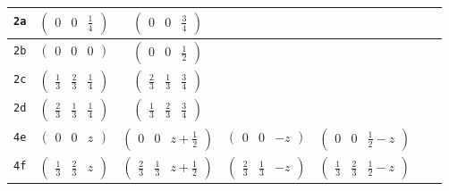 \documentclass[fleqn,9pt,landscape]{jsarticle}
\begin{document}
\begin{center}
\begin{longtable}{ccccccc}
{\tt 2a} & $ \begin{pmatrix} 0 & 0 & \frac{1}{4} \end{pmatrix} $ & $ \begin{pmatrix} 0 & 0 & \frac{3}{4} \end{pmatrix} $ & $  $ & $  $ & $  $ & $  $ \\ \hline
{\tt 2b} & $ \begin{pmatrix} 0 & 0 & 0 \end{pmatrix} $ & $ \begin{pmatrix} 0 & 0 & \frac{1}{2} \end{pmatrix} $ & $  $ & $  $ & $  $ & $  $ \\ \hline
{\tt 2c} & $ \begin{pmatrix} \frac{1}{3} & \frac{2}{3} & \frac{1}{4} \end{pmatrix} $ & $ \begin{pmatrix} \frac{2}{3} & \frac{1}{3} & \frac{3}{4} \end{pmatrix} $ & $  $ & $  $ & $  $ & $  $ \\ \hline
{\tt 2d} & $ \begin{pmatrix} \frac{2}{3} & \frac{1}{3} & \frac{1}{4} \end{pmatrix} $ & $ \begin{pmatrix} \frac{1}{3} & \frac{2}{3} & \frac{3}{4} \end{pmatrix} $ & $  $ & $  $ & $  $ & $  $ \\ \hline
{\tt 4e} & $ \begin{pmatrix} 0 & 0 & z \end{pmatrix} $ & $ \begin{pmatrix} 0 & 0 & z + \frac{1}{2} \end{pmatrix} $ & $ \begin{pmatrix} 0 & 0 & - z \end{pmatrix} $ & $ \begin{pmatrix} 0 & 0 & \frac{1}{2} - z \end{pmatrix} $ & $  $ & $  $ \\ \hline
{\tt 4f} & $ \begin{pmatrix} \frac{1}{3} & \frac{2}{3} & z \end{pmatrix} $ & $ \begin{pmatrix} \frac{2}{3} & \frac{1}{3} & z + \frac{1}{2} \end{pmatrix} $ & $ \begin{pmatrix} \frac{2}{3} & \frac{1}{3} & - z \end{pmatrix} $ & $ \begin{pmatrix} \frac{1}{3} & \frac{2}{3} & \frac{1}{2} - z \end{pmatrix} $ & $  $ & $  $ \\ \hline

\end{longtable}
\end{center}
\end{document}

